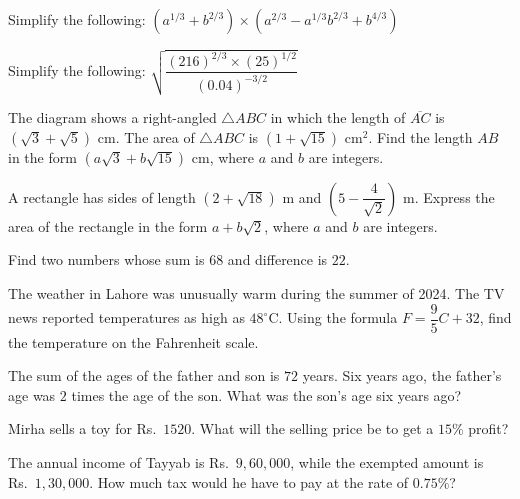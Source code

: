 \documentclass[11pt]{article}
\begin{document}
\begin{detq}
\item Simplify the following: $\left(a^{1/3}+b^{2/3}\right)\times\left(a^{2/3}-a^{1/3}b^{2/3}+b^{4/3}\right)$

\item Simplify the following: $\sqrt{\dfrac{(216)^{2/3}\times(25)^{1/2}}{(0.04)^{-3/2}}}$

\item The diagram shows a right-angled $\triangle ABC$ in which the length of $\overline{AC}$ is $(\sqrt{3}+\sqrt{5})$ cm. The area of $\triangle ABC$ is $(1+\sqrt{15})$ cm$^2$. Find the length $AB$ in the form $(a\sqrt{3}+b\sqrt{15})$ cm, where $a$ and $b$ are integers.
\begin{center}
\end{center}

\item A rectangle has sides of length $\left(2+\sqrt{18}\right)$ m and $\left(5-\dfrac{4}{\sqrt{2}}\right)$ m. Express the area of the rectangle in the form $a+b\sqrt{2}$, where $a$ and $b$ are integers.

\item Find two numbers whose sum is $68$ and difference is $22$.

\item The weather in Lahore was unusually warm during the summer of 2024. The TV news reported temperatures as high as $48^{\circ}$C. Using the formula $F=\dfrac{9}{5}C+32$, find the temperature on the Fahrenheit scale.

\item The sum of the ages of the father and son is $72$ years. Six years ago, the father's age was $2$ times the age of the son. What was the son's age six years ago?

\item Mirha sells a toy for Rs.\ $1520$. What will the selling price be to get a $15\%$ profit?

\item The annual income of Tayyab is Rs.\ $9{,}60{,}000$, while the exempted amount is Rs.\ $1{,}30{,}000$. How much tax would he have to pay at the rate of $0.75\%$?


\end{detq}
\end{document}
